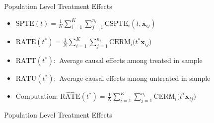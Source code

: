 \documentclass{beamer}
\begin{document}

\begin{frame}{Population Level Treatment Effects}
\begin{itemize}
   \vfill  \item ${\text{SPTE}}(t) = \frac{1}{N}
  \sum_{i=1}^{K} \sum_{j=1}^{n_i}\mathrm{CSPTE}_i(t,\mathbf{x}_{ij})$
  
 \vfill   \item  ${\mathrm{RATE}}(t^*)
= \frac{1}{N}
  \sum_{i=1}^{K} \sum_{j=1}^{n_i}
    {\mathrm{CERM}_i}\bigl(t^*\mathbf{x}_{ij}\bigr)$
   \vfill  \item $\text{RATT}(t^*):$ Average causal effects among treated in sample
  \vfill   \item $\text{RATU}(t^*):$ Average causal effects among untreated in sample
  \vfill   \item Computation: $\widehat{\mathrm{RATE}}(t^*)
= \frac{1}{N}
  \sum_{i=1}^{K} \sum_{j=1}^{n_i}
    \widehat{\mathrm{CERM}_i}\bigl(t^*\mathbf{x}_{ij}\bigr)$
    
\end{itemize}

\end{frame}


\begin{frame}{Population Level Treatment Effects}
\end{frame}
\end{document}
